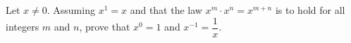 Let $x\ne0$. Assuming $x^1=x$ and that the law $x^m\cdot x^n=x^{m+n}$ is to hold for all integers $m$ and $n$, prove that $x^0=1$ and $x^{-1}=\dfrac1x$.

